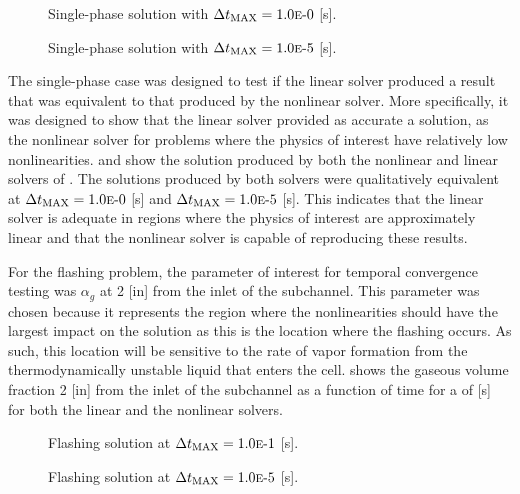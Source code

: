 \begin{figure}[h!tb]
\centering

\caption{Single-phase solution with $\dtmax{} = \expneg{1.0}{0}$ [s].}
\label{fig:single1pt000em0}
\end{figure}

\begin{figure}[h!tb]
\centering

\caption{Single-phase solution with $\dtmax{} = \expneg{1.0}{5}$ [s].}
\label{fig:single1pt000em5}
\end{figure}

The single-phase case was designed to test if the linear solver produced a result that was equivalent to that produced by the nonlinear solver.
More specifically, it was designed to show that the linear solver provided as accurate a solution, as the nonlinear solver for problems where the physics of interest have relatively low nonlinearities.
 and  show the solution produced by both the nonlinear and linear solvers of \cobra{}.
The solutions produced by both solvers were qualitatively equivalent at $\dtmax{} = \expneg{1.0}{0}$ [s] and $\dtmax{} = \expneg{1.0}{5}$ [s].
This indicates that the linear solver is adequate in regions where the physics of interest are approximately linear and that the nonlinear solver is capable of reproducing these results.

For the flashing problem, the parameter of interest for temporal convergence testing was $\alpha_g$ at 2 [in] from the inlet of the subchannel.
This parameter was chosen because it represents the region where the nonlinearities should have the largest impact on the solution as this is the location where the flashing occurs.
As such, this location will be sensitive to the rate of vapor formation from the thermodynamically unstable liquid that enters the cell.
 shows the gaseous volume fraction 2 [in] from the inlet of the subchannel as a function of time for a \dtmax{} of  [s] for both the linear and the nonlinear solvers.

\begin{figure}[h!tb]
\centering

\caption{Flashing solution at $\dtmax{} = \expneg{1.0}{1}$ [s].}
\label{fig:flashing1pt0000em0}
\end{figure}

\begin{figure}[h!tb]
\centering

\caption{Flashing solution at $\dtmax{} = \expneg{1.0}{5}$ [s].}
\label{fig:flashing1pt0000em5}
\end{figure}

